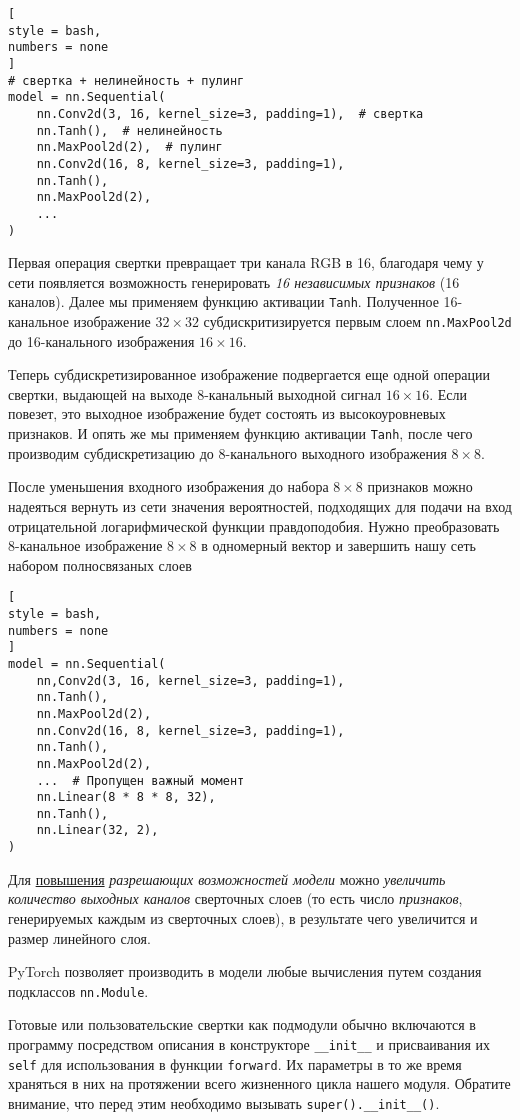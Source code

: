 \documentclass[%
	11pt,
	a4paper,
	utf8,
		]{article}
\begin{document}
\begin{lstlisting}[
style = bash,
numbers = none
]
# свертка + нелинейность + пулинг
model = nn.Sequential(
    nn.Conv2d(3, 16, kernel_size=3, padding=1),  # свертка
    nn.Tanh(),  # нелинейность
    nn.MaxPool2d(2),  # пулинг
    nn.Conv2d(16, 8, kernel_size=3, padding=1),
    nn.Tanh(),
    nn.MaxPool2d(2),
    ...
)
\end{lstlisting}

Первая операция свертки превращает три канала RGB в 16, благодаря чему у сети появляется возможность генерировать \emph{16 независимых признаков} (16 каналов). Далее мы применяем функцию активации \verb|Tanh|. Полученное 16-канальное изображение $32 \times 32$ субдискритизируется первым слоем \verb|nn.MaxPool2d| до 16-канального изображения $16 \times 16$. 

Теперь субдискретизированное изображение подвергается еще одной операции свертки, выдающей на выходе 8-канальный выходной сигнал $16 \times 16$. Если повезет, это выходное изображение будет состоять из высокоуровневых признаков. И опять же мы применяем функцию активации \verb|Tanh|, после чего производим субдискретизацию до 8-канального выходного изображения $8 \times 8 $.

После уменьшения входного изображения до набора $8 \times 8$ признаков можно надеяться вернуть из сети значения вероятностей, подходящих для подачи на вход отрицательной логарифмической функции правдоподобия. Нужно преобразовать 8-канальное изображение $8 \times 8$ в одномерный вектор и завершить нашу сеть набором полносвязаных слоев
\begin{lstlisting}[
style = bash,
numbers = none
]
model = nn.Sequential(
    nn,Conv2d(3, 16, kernel_size=3, padding=1),
    nn.Tanh(),
    nn.MaxPool2d(2),
    nn.Conv2d(16, 8, kernel_size=3, padding=1),
    nn.Tanh(),
    nn.MaxPool2d(2),
    ...  # Пропущен важный момент
    nn.Linear(8 * 8 * 8, 32),
    nn.Tanh(),
    nn.Linear(32, 2),
)
\end{lstlisting}

Для \underline{повышения} \emph{разрешающих возможностей модели} можно \emph{увеличить количество выходных каналов} сверточных слоев (то есть число \emph{признаков}, генерируемых каждым из сверточных слоев), в результате чего увеличится и размер линейного слоя.

PyTorch позволяет производить в модели любые вычисления путем создания подклассов \verb|nn.Module|.

Готовые или пользовательские свертки как подмодули обычно включаются в программу посредством описания в конструкторе \verb|__init__| и присваивания их \verb|self| для использования в функции \verb|forward|. Их параметры в то же время храняться в них на протяжении всего жизненного цикла нашего модуля. Обратите внимание, что перед этим необходимо вызывать \verb|super().__init__()|.
\end{document}
